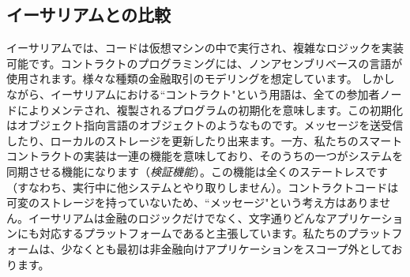 \documentclass{article}
\begin{document}
\subsection{イーサリアムとの比較}
イーサリアムでは、コードは仮想マシンの中で実行され、複雑なロジックを実装可能です。コントラクトのプログラミングには、ノンアセンブリベースの言語が使用されます。様々な種類の金融取引のモデリングを想定しています。
しかしながら、イーサリアムにおける``コントラクト"という用語は、全ての参加者ノードによりメンテされ、複製されるプログラムの初期化を意味します。この初期化はオブジェクト指向言語のオブジェクトのようなものです。メッセージを送受信したり、ローカルのストレージを更新したり出来ます。一方、私たちのスマートコントラクトの実装は一連の機能を意味しており、そのうちの一つがシステムを同期させる機能になります（\textit{検証機能}）。この機能は全くのステートレスです（すなわち、実行中に他システムとやり取りしません）。コントラクトコードは可変のストレージを持っていないため、``メッセージ"という考え方はありません。イーサリアムは金融のロジックだけでなく、文字通りどんなアプリケーションにも対応するプラットフォームであると主張しています。私たちのプラットフォームは、少なくとも最初は非金融向けアプリケーションをスコープ外としております。



\end{document}
